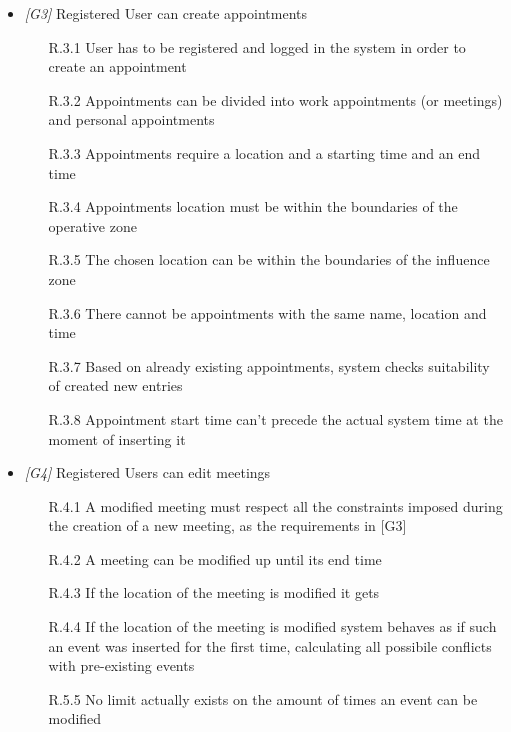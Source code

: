 \begin{itemize}
\item \textit{[G3]} Registered User can create appointments 

 \begin{itemize}
                        \item [R.3.1] User has to be registered and logged in the system in order to create an
appointment
                        \item [R.3.2] Appointments can be divided into work appointments (or meetings) and personal appointments
                        \item [R.3.3] Appointments require a location and a starting time and an end time
                        \item [R.3.4] Appointments location must be within the boundaries of the operative zone
                        \item [R.3.5] The chosen location can be within the boundaries of the influence zone
                        \item [R.3.6] There cannot be appointments with the same name, location and time
                        \item [R.3.7] Based on already existing appointments, system checks suitability of created new entries
                        \item [R.3.8] Appointment start time can't precede the actual system time at the moment of inserting it                        
                  \end{itemize}
                  
\item \textit{[G4]} Registered Users can edit meetings

                  \begin{itemize}
                       \item  [R.4.1] A modified meeting must respect all the constraints imposed during the creation of a new meeting, as the requirements in [G3]
                       \item [R.4.2] A meeting can be modified up until its end time
                       \item [R.4.3] If the location of the meeting is modified it gets 
                       \item [R.4.4] If the location of the meeting is modified system behaves as if such an event was inserted for the first time, calculating all possibile conflicts with pre-existing events
                       \item [R.5.5] No limit actually exists on the amount of times an event can be modified                     


\end{itemize}
\end{itemize}
